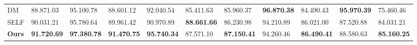 \begin{table*}[]
\begin{tabular}{@{}lllllllllll@{}}
DM                       & 88.871.03          & 95.100.78          & 88.601.12               & 92.040.54          & 85.411.63             & 85.960.37          & \textbf{96.870.38} & 84.490.43               & \textbf{95.970.39} & 75.460.46             \\
SELF                            & 90.031.21          & 95.780.64          & 89.961.42               & 90.970.89          & \textbf{88.661.66}             & 86.230.98          & 94.210.89          & 86.021.00               & 87.520.88          & 84.031.21             \\
\textbf{Ours}                   & \textbf{91.720.69} & \textbf{97.380.78} & \textbf{91.470.75}      & \textbf{95.740.34} & 87.571.10             & \textbf{87.150.41} & 94.260.46          & \textbf{86.490.41}      & 88.580.63          & \textbf{85.160.25}    \\ \bottomrule
\end{tabular}
\end{table*}


